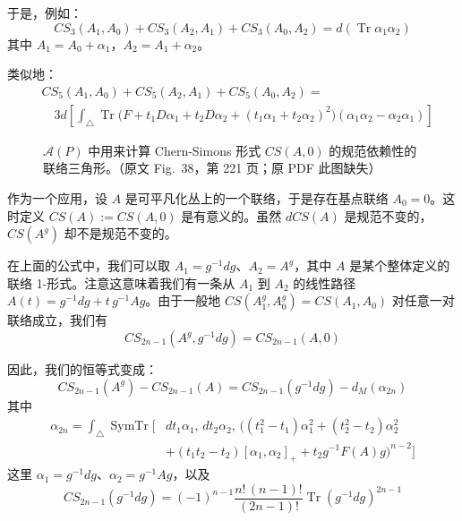 于是，例如：
\begin{equation}
  CS_3(A_1,A_0)+CS_3(A_2,A_1)+CS_3(A_0,A_2) = d(\operatorname{Tr}\alpha_1\alpha_2)
  \tag{I.48}
  \label{eq:I.48}
\end{equation}
其中 $A_1=A_0+\alpha_1$，$A_2=A_1+\alpha_2$。

类似地：
\begin{equation}
\begin{aligned}
  &CS_5(A_1,A_0)+CS_5(A_2,A_1)+CS_5(A_0,A_2) =\\
  &\quad 3d\left[\int_\triangle \operatorname{Tr}
    \big(F+t_1D\alpha_1+t_2D\alpha_2+(t_1\alpha_1+t_2\alpha_2)^2\big)(\alpha_1\alpha_2-\alpha_2\alpha_1)\right]
\end{aligned}
  \tag{I.49}
  \label{eq:I.49}
\end{equation}

\begin{figure}[htbp]
  \centering
  \MissingFigureNote
  \caption{$\mathcal{A}(P)$ 中用来计算 Chern-Simons 形式 $CS(A,0)$ 的规范依赖性的联络三角形。（原文 Fig.~38，第 221 页；原 PDF 此图缺失）}
  \label{fig:38}
\end{figure}

作为一个应用，设 $A$ 是可平凡化丛上的一个联络，于是存在基点联络 $A_0=0$。这时定义 $CS(A):=CS(A,0)$ 是有意义的。虽然 $dCS(A)$ 是规范不变的，$CS(A^g)$ 却不是规范不变的。

在上面的公式中，我们可以取 $A_1=g^{-1}dg$、$A_2=A^g$，其中 $A$ 是某个整体定义的联络 1-形式。注意这意味着我们有一条从 $A_1$ 到 $A_2$ 的线性路径 $A(t)=g^{-1}dg+t\,g^{-1}Ag$。由于一般地 $CS(A_1^g,A_0^g)=CS(A_1,A_0)$ 对任意一对联络成立，我们有
\begin{equation}
  CS_{2n-1}(A^g,g^{-1}dg) = CS_{2n-1}(A,0)
  \tag{I.50}
  \label{eq:I.50}
\end{equation}

因此，我们的恒等式变成：
\begin{equation}
  CS_{2n-1}(A^g)-CS_{2n-1}(A) = CS_{2n-1}(g^{-1}dg)-d_M(\alpha_{2n})
  \tag{I.51}
  \label{eq:I.51}
\end{equation}
其中
\begin{equation}
\begin{aligned}
  \alpha_{2n} = \int_\triangle \operatorname{SymTr}\Big[&
    dt_1\alpha_1,\,dt_2\alpha_2,\,
    \Big((t_1^2-t_1)\alpha_1^2+(t_2^2-t_2)\alpha_2^2\\
  &+(t_1t_2-t_2)[\alpha_1,\alpha_2]_+ + t_2g^{-1}F(A)g\Big)^{n-2}\Big]
\end{aligned}
  \tag{I.52}
  \label{eq:I.52}
\end{equation}
这里 $\alpha_1=g^{-1}dg$、$\alpha_2=g^{-1}Ag$，以及
\begin{equation}
  CS_{2n-1}(g^{-1}dg) = (-1)^{n-1}\frac{n!\,(n-1)!}{(2n-1)!}
  \operatorname{Tr}(g^{-1}dg)^{2n-1}
  \tag{I.53}
  \label{eq:I.53}
\end{equation}

